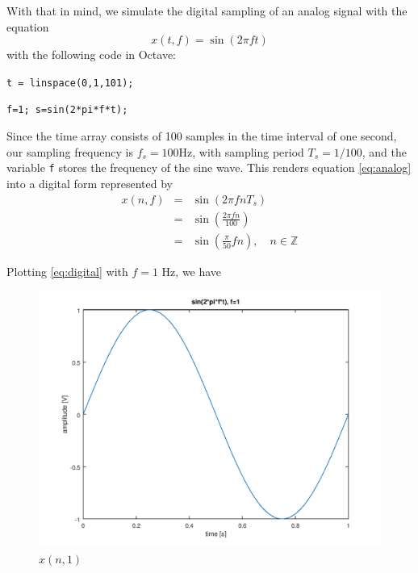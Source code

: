 \documentclass[a4paper, 12pt]{report}
\begin{document}
			With that in mind, we simulate the digital sampling of an analog signal with the equation
			\begin{equation}
				x(t,f) = \sin(2\pi f t)
				\label{eq:analog}
			\end{equation}
			\noindent with the following code in Octave:\par
			\texttt{t = linspace(0,1,101);}\par
			\texttt{f=1; s=sin(2*pi*f*t);}\par

			\vspace*{1em}\noindent Since the time array consists of 100 samples in the time interval of one second, our sampling frequency is $f_s = 100 \text{Hz}$, with sampling period $T_s = 1/100$, and the variable \texttt{f} stores the frequency of the sine wave. This renders equation \ref{eq:analog} into a digital form represented by
			\begin{equation}
				\begin{array}{rcl}
					x(n, f) & = & \sin(2\pi fnT_s) \\
					& = & \sin\left(\frac{2\pi f n}{100}\right)\\
					& = & \sin\left(\frac{\pi}{50}fn\right), \quad n \in \mathbb{Z}
				\end{array}
				\label{eq:digital}
			\end{equation}

			Plotting \ref{eq:digital} with $f=1$ Hz, we have
			\begin{figure}[H]
				\includegraphics[width=\textwidth]{img/1_1.png}
				\caption{$x(n, 1)$}
				\label{fig:1}
			\end{figure}
\end{document}
